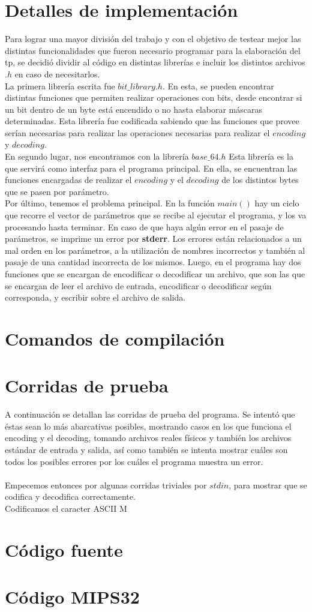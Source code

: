 \documentclass[11pt]{article}
\begin{document}
    \section*{Detalles de implementación}
        Para lograr una mayor división del trabajo y con el objetivo de testear mejor las distintas funcionalidades que fueron necesario programar para la elaboración del tp, se decidió dividir al código en distintas librerías e incluir los distintos archivos $.h$ en caso de necesitarlos.\\
        La primera librería escrita fue $bit\_library.h$. En esta, se pueden encontrar distintas funciones que permiten realizar operaciones con bits, desde encontrar si un bit dentro de un byte está encendido o no hasta elaborar máscaras determinadas. Esta librería fue codificada sabiendo que las funciones que provee serían necesarias para realizar las operaciones necesarias para realizar el $encoding$ y $decoding$. \\
        En segundo lugar, nos encontramos con la librería $base\_64.h$ Esta librería es la que servirá como interfaz para el programa principal. En ella, se encuentran las funciones encargadas de realizar el $encoding$ y el $decoding$ de los distintos bytes que se pasen por parámetro. \\
        Por último, tenemos el problema principal. En la función $main()$ hay un ciclo que recorre el vector de parámetros que se recibe al ejecutar el programa, y los va procesando hasta terminar. En caso de que haya algún error en el pasaje de parámetros, se imprime un error por \textbf{stderr}. Los errores están relacionados a un mal orden en los parámetros, a la utilización de nombres incorrectos y también al pasaje de una cantidad incorrecta de los mismos. Luego, en el programa hay dos funciones que se encargan de encodificar o decodificar un archivo, que son las que se encargan de leer el archivo de entrada, encodificar o decodificar según corresponda, y escribir sobre el archivo de salida.
    \section*{Comandos de compilación}

    \section*{Corridas de prueba}
        A continuación se detallan las corridas de prueba del programa. Se intentó que éstas sean lo más abarcativas posibles, mostrando casos en los que funciona el encoding y el decoding, tomando archivos reales físicos y también los archivos estándar de entrada y salida, así como también se intenta mostrar cuáles son todos los posibles errores por los cuáles el programa muestra un error.\\
        \\
        Empecemos entonces por algunas corridas triviales por $stdin$, para mostrar que se codifica y decodifica correctamente.\\
        Codificamos el caracter ASCII M
        
    \section*{Código fuente}
    \section*{Código MIPS32}
    
\end{document}
